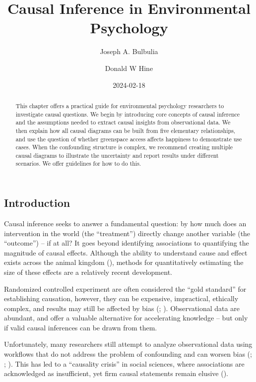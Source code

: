 \documentclass[
  singlecolumn]{article}
\title{Causal Inference in Environmental Psychology}
\author{Joseph A. Bulbulia \and Donald W Hine}
\date{2024-02-18}
\begin{document}
\maketitle
\begin{abstract}
This chapter offers a practical guide for environmental psychology
researchers to investigate causal questions. We begin by introducing
core concepts of causal inference and the assumptions needed to extract
causal insights from observational data. We then explain how all causal
diagrams can be built from five elementary relationships, and use the
question of whether greenspace access affects happiness to demonstrate
use cases. When the confounding structure is complex, we recommend
creating multiple causal diagrams to illustrate the uncertainty and
report results under different scenarios. We offer guidelines for how to
do this.
\end{abstract}

\subsection{Introduction}\label{introduction}

Causal inference seeks to answer a fundamental question: by how much
does an intervention in the world (the ``treatment'') directly change
another variable (the ``outcome'') -- if at all? It goes beyond
identifying associations to quantifying the magnitude of causal effects.
Although the ability to understand cause and effect exists across the
animal kingdom (),
methods for quantitatively estimating the size of these effects are a
relatively recent development.

Randomized controlled experiment are often considered the ``gold
standard'' for establishing causation, however, they can be expensive,
impractical, ethically complex, and results may still be affected by
bias (;
).
Observational data are abundant, and offer a valuable alternative for
accelerating knowledge -- but only if valid causal inferences can be
drawn from them.

Unfortunately, many researchers still attempt to analyze observational
data using workflows that do not address the problem of confounding and
can worsen bias (;
;
). This has
led to a ``causality crisis'' in social sciences, where associations are
acknowledged as insufficient, yet firm causal statements remain elusive
().
\end{document}
